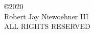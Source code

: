 
\begin{center}
\begin{singlespace}
\copyright 2020\\
Robert Jay Niewoehner III \\
ALL RIGHTS RESERVED
\end{singlespace}
\end{center}

\clearpage
